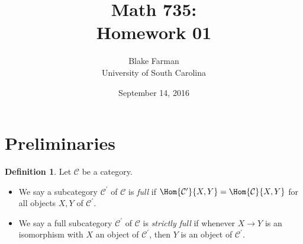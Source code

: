 \documentclass[10pt]{amsart}
\author{Blake Farman\\University of South Carolina}
\title{Math 735:\\Homework 01}
\date{September 14, 2016}
\begin{document}

\providecommand{\p}{\mathfrak{p}}
\providecommand{\m}{\mathfrak{m}}
\providecommand{\Deck}[1]{\operatorname{Deck}\left(#1\right)}
\newtheorem{thm}{Theorem}
\newtheorem{ex}{}
\newtheorem{lem}{Lemma}
\newtheorem{cor}{Corollary}
\newtheorem{prop}{Proposition}
\theoremstyle{definition}
\newtheorem{defn}{Definition}

\newcommand{\A}{\mathbb{A}}
\newcommand{\T}{\mathcal{T}}
\section{Preliminaries}
\begin{defn}
  Let $\mathcal{C}$ be a category.
  \begin{itemize}
  \item
    We say a subcategory $\mathcal{C^\prime}$ of $\mathcal{C}$ is {\it full} if 
    $\Hom{\mathcal{C^\prime}}{X,Y} = \Hom{\mathcal{C}}{X,Y}$
    for all objects $X,Y$ of $\mathcal{C^\prime}$.
  \item
    We say a full subcategory $\mathcal{C^\prime}$ of $\mathcal{C}$ is {\it strictly full} if whenever $X \rightarrow Y$ is an isomorphism with $X$ an object of $\mathcal{C^\prime}$, then $Y$ is an object of $\mathcal{C^\prime}$.
  \end{itemize}
\end{defn}
\end{document}
